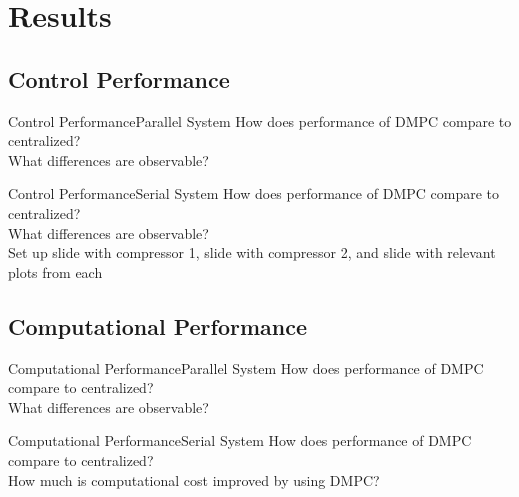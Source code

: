 \section{Results}

\subsection{Control Performance}
\begin{frame}{Control Performance}{Parallel System}
  How does performance of DMPC compare to centralized?\\
  What differences are observable?
\end{frame}

\begin{frame}{Control Performance}{Serial System}
  How does performance of DMPC compare to centralized?\\
  What differences are observable?\\
  Set up slide with compressor 1, slide with compressor 2, and slide with relevant plots from each
\end{frame}

\subsection{Computational Performance}
\begin{frame}{Computational Performance}{Parallel System}
  How does performance of DMPC compare to centralized?\\
  What differences are observable?
\end{frame}

\begin{frame}{Computational Performance}{Serial System}
  How does performance of DMPC compare to centralized?\\
  How much is computational cost improved by using DMPC?
\end{frame}



